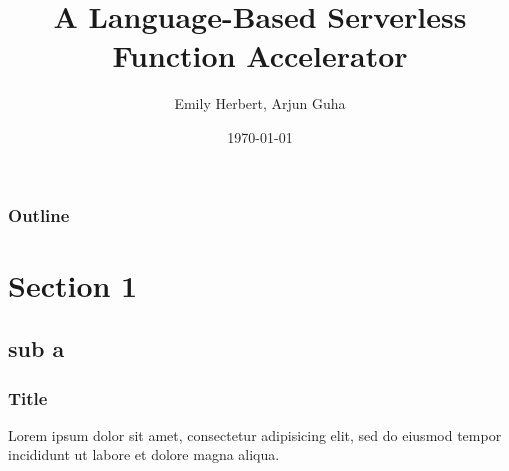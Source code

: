 \documentclass{beamer}
\title{A Language-Based Serverless Function Accelerator}
\author{Emily Herbert, Arjun Guha}
\institute{University of Massachusetts Amherst}
\date{\today}
\begin{document}
\begin{frame}
\titlepage
\end{frame}

\begin{frame}
\frametitle{Outline}
\tableofcontents
\end{frame}

\section{Section 1}
\subsection{sub a}

\begin{frame}
\frametitle{Title}
Lorem ipsum dolor sit amet, consectetur adipisicing elit, sed do eiusmod tempor incididunt ut labore et dolore magna aliqua.
\end{frame}
\end{document}
